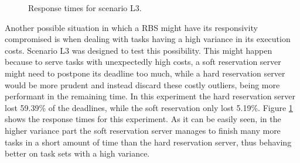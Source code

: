 \documentclass[times, 10pt,twocolumn]{article}
\begin{document}
\begin{figure}[t]
  \centering
  \caption{Response times for scenario L3.}
  \label{fig:variance}
\end{figure}

Another possible situation in which a RBS might have its responsivity
compromised is when dealing with tasks having a high variance in its
execution costs. Scenario L3 was designed to test this
possibility. This might happen because to serve tasks with
unexpectedly high costs, a soft reservation server might need to
postpone its deadline too much, while a hard reservation server would
be more prudent and instead discard these costly outliers, being more
performant in the remaining time. In this experiment the hard
reservation server lost 59.39\% of the deadlines, while the soft
reservation only lost 5.19\%. Figure \ref{fig:variance} shows the
response times for this experiment. As it can be easily seen, in the
higher variance part the soft reservation server manages to finish
many more tasks in a short amount of time than the hard reservation
server, thus behaving better on task sets with a high variance.
\end{document}
